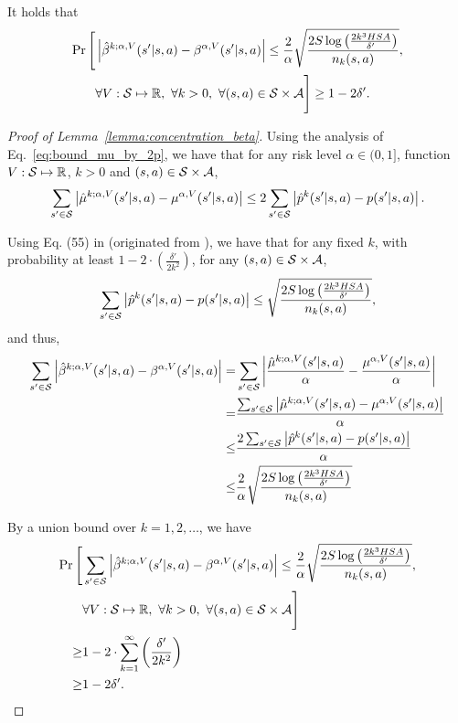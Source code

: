 \begin{lemma} \label{lemma:concentration_beta} 
	It holds that
	\begin{align*}
		\Pr \Bigg[ &\left|  \hat{\beta}^{k;\alpha,V}(s'|s,a) - \beta^{\alpha,V}(s'|s,a)  \right| \leq \frac{2}{\alpha}\sqrt{\frac{2S\log \left( \frac{2k^3HSA}{\delta'} \right)}{n_k(s,a)}} ,
		\\ & \forall V: \mathcal{S} \mapsto \mathbb{R},\ \forall k>0,\ \forall (s,a) \in \mathcal{S} \times \mathcal{A} \Bigg] \geq 1-2\delta' .
	\end{align*}
\end{lemma}
\begin{proof}[Proof of Lemma~\ref{lemma:concentration_beta}]
	Using the analysis of Eq.~\eqref{eq:bound_mu_by_2p}, we have that for any risk level $\alpha \in (0,1]$, function $V: \mathcal{S} \mapsto \mathbb{R}$, $k>0$ and $(s,a) \in \mathcal{S} \times \mathcal{A}$,
	\begin{align}
		\sum_{s' \in \mathcal{S}} \left| \hat{\mu}^{k;\alpha,V}(s'|s,a)-\mu^{\alpha,V}(s'|s,a) \right| \leq 2 \sum_{s' \in \mathcal{S}} \left| \hat{p}^k(s'|s,a)-p(s'|s,a) \right| .
	\end{align}
	
	Using Eq. (55) in \citep{zanette2019tighter} (originated from \citep{weissman2003inequalities}), we have that for any fixed $k$, with probability at least $1-2 \cdot (\frac{\delta'}{2 k^2})$, for any $(s,a) \in \mathcal{S} \times \mathcal{A}$,
	\begin{align*}
		\sum_{s' \in \mathcal{S}} \left| \hat{p}^{k}(s'|s,a)-p(s'|s,a) \right| \leq \sqrt{\frac{2S\log \left( \frac{2k^3HSA}{\delta'} \right)}{n_k(s,a)}} ,
	\end{align*}
	and thus,
	\begin{align*}
		\sum_{s' \in \mathcal{S}} \left| \hat{\beta}^{k;\alpha,V}(s'|s,a)-\beta^{\alpha,V}(s'|s,a) \right|
		= & \sum_{s' \in \mathcal{S}} \left|  \frac{\hat{\mu}^{k;\alpha,V}(s'|s,a)}{\alpha} - \frac{\mu^{\alpha,V}(s'|s,a)}{\alpha}  \right|
		\\
		= & \frac{ \sum_{s' \in \mathcal{S}} \left| \hat{\mu}^{k;\alpha,V}(s'|s,a) - \mu^{\alpha,V}(s'|s,a) \right| }{\alpha}
		\\
		\leq &  \frac{ 2 \sum_{s' \in \mathcal{S}} \left| \hat{p}^k(s'|s,a)-p(s'|s,a) \right| }{\alpha}
		\\
		\leq & \frac{2}{\alpha} \sqrt{\frac{2S\log \left( \frac{2k^3HSA}{\delta'} \right)}{n_k(s,a)}}
	\end{align*}
	
	By a union bound over $k=1,2,\dots$, we have
	\begin{align*}
		\Pr \Bigg[ & \sum_{s' \in \mathcal{S}} \left| \hat{\beta}^{k;\alpha,V}(s'|s,a)-\beta^{\alpha,V}(s'|s,a) \right| \leq  \frac{2}{\alpha} \sqrt{\frac{2S\log \left( \frac{2k^3HSA}{\delta'} \right)}{n_k(s,a)}} ,
		\\ & \forall V: \mathcal{S} \mapsto \mathbb{R},\ \forall k>0,\ \forall (s,a) \in \mathcal{S} \times \mathcal{A} \Bigg]
		\\
		\geq & 1-2 \cdot \sum_{k=1}^{\infty} \left( \frac{\delta'}{2 k^2} \right)
		\\
		\geq & 1-2\delta' .
	\end{align*}
\end{proof}

